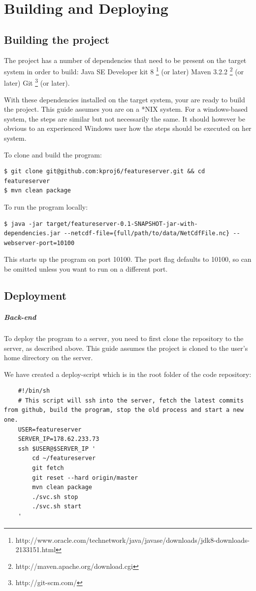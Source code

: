 \documentclass[11pt,a4paper,titlepage,oneside]{report}
\begin{document}
\chapter{Building and Deploying}
\section{Building the project}
The project has a number of dependencies that need to be present on the target system in order to build:
Java SE Developer kit 8 \footnote{http://www.oracle.com/technetwork/java/javase/downloads/jdk8-downloads-2133151.html} (or later)
Maven 3.2.2 \footnote{http://maven.apache.org/download.cgi} (or later)
Git \footnote{http://git-scm.com/} (or later).

With these dependencies installed on the target system, your are ready to build the project.
This guide assumes you are on a *NIX system. For a windows-based system, the steps are similar but not necessarily the same. It should however be obvious to an experienced Windows user how the steps should be executed on her system.

To clone and build the program:
\begin{lstlisting}
$ git clone git@github.com:kproj6/featureserver.git && cd featureserver
$ mvn clean package
\end{lstlisting}

To run the program locally:
\begin{lstlisting}
$ java -jar target/featureserver-0.1-SNAPSHOT-jar-with-dependencies.jar --netcdf-file={full/path/to/data/NetCdfFile.nc} --webserver-port=10100
\end{lstlisting}

This starts up the program on port 10100. The port flag defaults to 10100, so can be omitted unless you want to run on a different port.

\section{Deployment}
\paragraph{Back-end}
To deploy the program to a server, you need to first clone the repository to the server, as described above.
This guide assumes the project is cloned to the user's home directory on the server.

We have created a deploy-script which is in the root folder of the code repository:
\begin{lstlisting}
	#!/bin/sh
	# This script will ssh into the server, fetch the latest commits from github, build the program, stop the old process and start a new one.
	USER=featureserver
	SERVER_IP=178.62.233.73
	ssh $USER@$SERVER_IP '
	    cd ~/featureserver
	    git fetch
	    git reset --hard origin/master
	    mvn clean package
	    ./svc.sh stop
	    ./svc.sh start
	'
\end{lstlisting}
\end{document}

